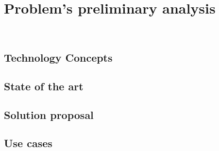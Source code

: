 
\chapter{Problem's preliminary analysis}
\label{cap:processi-metodologie}

\\

\section{Technology Concepts}

\section{State of the art}

\section{Solution proposal}

\section{Use cases}